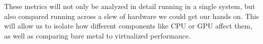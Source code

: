 These metrics will not only be analyzed in detail running in a single system, but also compared running across a slew of hardware we could get our hands on. This will allow us to isolate how different components like CPU or GPU affect them, as well as comparing bare metal to virtualized performance.

%
%
%


